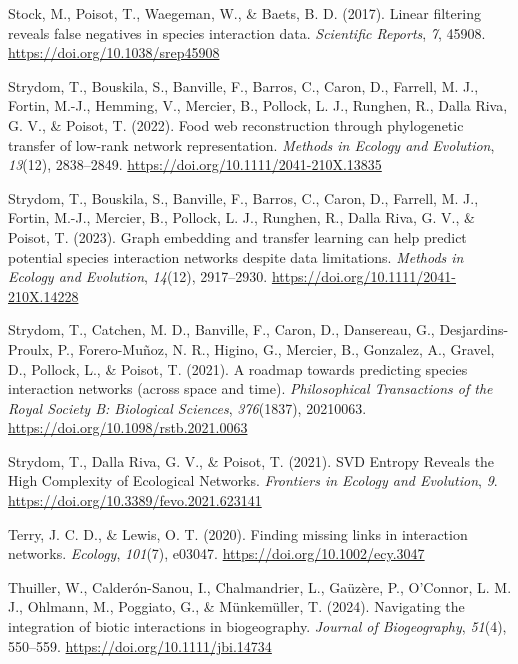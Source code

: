 \documentclass[
]{article}
\newlength{\cslhangindent}
\newenvironment{CSLReferences}[2] %
 {\begin{list}{}{%
  \setlength{\itemindent}{0pt}
  \setlength{\leftmargin}{0pt}
  \setlength{\parsep}{0pt}
  \ifodd #1
   \setlength{\leftmargin}{\cslhangindent}
   \setlength{\itemindent}{-1\cslhangindent}
  \fi
  \setlength{\itemsep}{#2\baselineskip}}}
 {\end{list}}
\begin{document}
\begin{CSLReferences}{1}{0}
Stock, M., Poisot, T., Waegeman, W., \& Baets, B. D. (2017). Linear
filtering reveals false negatives in species interaction data.
\emph{Scientific Reports}, \emph{7}, 45908.
\url{https://doi.org/10.1038/srep45908}

Strydom, T., Bouskila, S., Banville, F., Barros, C., Caron, D., Farrell,
M. J., Fortin, M.-J., Hemming, V., Mercier, B., Pollock, L. J., Runghen,
R., Dalla Riva, G. V., \& Poisot, T. (2022). Food web reconstruction
through phylogenetic transfer of low-rank network representation.
\emph{Methods in Ecology and Evolution}, \emph{13}(12), 2838--2849.
\url{https://doi.org/10.1111/2041-210X.13835}

Strydom, T., Bouskila, S., Banville, F., Barros, C., Caron, D., Farrell,
M. J., Fortin, M.-J., Mercier, B., Pollock, L. J., Runghen, R., Dalla
Riva, G. V., \& Poisot, T. (2023). Graph embedding and transfer learning
can help predict potential species interaction networks despite data
limitations. \emph{Methods in Ecology and Evolution}, \emph{14}(12),
2917--2930. \url{https://doi.org/10.1111/2041-210X.14228}

Strydom, T., Catchen, M. D., Banville, F., Caron, D., Dansereau, G.,
Desjardins-Proulx, P., Forero-Muñoz, N. R., Higino, G., Mercier, B.,
Gonzalez, A., Gravel, D., Pollock, L., \& Poisot, T. (2021). A roadmap
towards predicting species interaction networks (across space and time).
\emph{Philosophical Transactions of the Royal Society B: Biological
Sciences}, \emph{376}(1837), 20210063.
\url{https://doi.org/10.1098/rstb.2021.0063}

Strydom, T., Dalla Riva, G. V., \& Poisot, T. (2021). {SVD Entropy
Reveals} the {High Complexity} of {Ecological Networks}. \emph{Frontiers
in Ecology and Evolution}, \emph{9}.
\url{https://doi.org/10.3389/fevo.2021.623141}

Terry, J. C. D., \& Lewis, O. T. (2020). Finding missing links in
interaction networks. \emph{Ecology}, \emph{101}(7), e03047.
\url{https://doi.org/10.1002/ecy.3047}

Thuiller, W., Calderón-Sanou, I., Chalmandrier, L., Gaüzère, P.,
O'Connor, L. M. J., Ohlmann, M., Poggiato, G., \& Münkemüller, T.
(2024). Navigating the integration of biotic interactions in
biogeography. \emph{Journal of Biogeography}, \emph{51}(4), 550--559.
\url{https://doi.org/10.1111/jbi.14734}


\end{CSLReferences}
\end{document}
